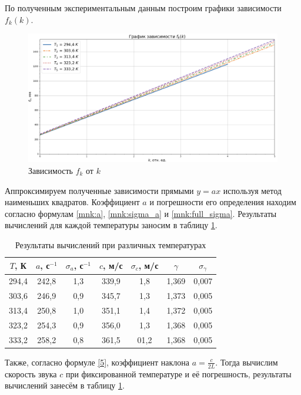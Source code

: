 \documentclass[a4paper,12pt]{article}
\theoremstyle{definition}
\begin{document}
	По полученным экспериментальным данным построим графики зависимости $ f_k(k) $.
	
	\begin{figure}[h!]
		\centering
		\includegraphics[scale=0.542]{graph2}
		\caption{Зависимость $ f_k $ от $ k $}
		\label{graph}
	\end{figure}

	Аппроксимируем полученные зависимости прямыми $ y=ax $ используя метод наименьших квадратов. Коэффициент $ a $ и погрешности его определения находим согласно формулам \eqref{mnk:a}, \eqref{mnk:sigma_a} и \eqref{mnk:full_sigma}. Результаты вычислений для каждой температуры заносим в таблицу \ref{tab:resConstL}.
	
	\begin{table}[H]
		\centering
		\begin{tabular}{|c|c|c|c|c|c|c|}
			\hline
			$ T $, К & $ a $, с$ ^{-1} $ & $ \sigma_a $, с$ ^{-1} $ & $ c $, м/с & $ \sigma_c $, м/с & $ \gamma $ & $ \sigma_\gamma $ \\ \hline
			294,4 & 242,8 & 1,3 & 339,9 & 1,8 & 1,369 & 0,007 \\ \hline
			303,6 & 246,9 & 0,9 & 345,7 & 1,3 & 1,373 & 0,005 \\ \hline
			313,4 & 250,8 & 1,0 & 351,1 & 1,4 & 1,372 & 0,005 \\ \hline
			323,2 & 254,3 & 0,9 & 356,0 & 1,3 & 1,368 & 0,005 \\ \hline
			333,2 & 258,2 & 0,8 & 361,5 & 01,2 & 1,368 & 0,005 \\ \hline
		\end{tabular}
		\caption{Результаты вычислений при различных температурах}
		\label{tab:resConstL}
	\end{table}
	
	Также, согласно формуле \eqref{5}, коэффициент наклона $ \displaystyle a = \frac{c}{2L}$. Тогда вычислим скорость звука $ c $ при фиксированной температуре и её погрешность, результаты вычислений занесём в таблицу \ref{tab:resConstL}.
	
\end{document}
